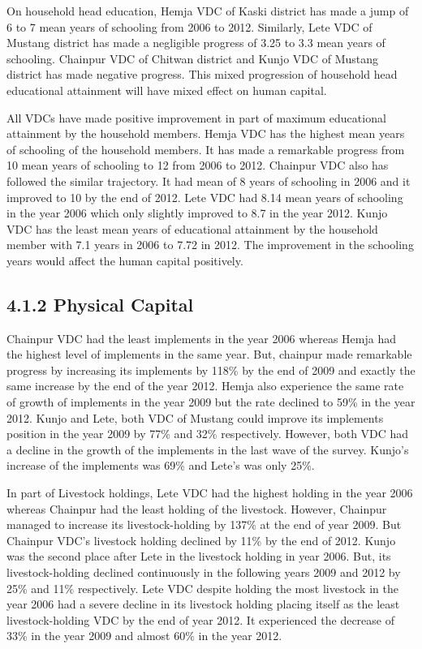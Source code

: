 On household head education, Hemja VDC of Kaski district has made a jump of 6 to 7 mean years of schooling from 2006 to 2012. Similarly, Lete VDC of Mustang district has made a negligible progress of 3.25 to 3.3 mean years of schooling. Chainpur VDC of Chitwan district and Kunjo VDC of Mustang district has made negative progress. This mixed progression of household head educational attainment will have mixed effect on human capital. 

All VDCs have made positive improvement in part of maximum educational attainment by the household members. Hemja VDC has the highest mean years of schooling of the household members. It has made a remarkable progress from 10 mean years of schooling to 12 from 2006 to 2012. Chainpur VDC also has followed the similar trajectory. It had mean of 8 years of schooling in 2006 and it improved to 10 by the end of 2012. Lete VDC had 8.14 mean years of schooling in the year 2006 which only slightly improved to 8.7 in the year 2012. Kunjo VDC has the least mean years of educational attainment by the household member with 7.1 years in 2006 to 7.72 in 2012. The improvement in the schooling years would affect the human capital positively.

\subsection*{4.1.2 Physical Capital}
Chainpur VDC had the least implements in the year 2006 whereas Hemja had the highest level of implements in the same year. But, chainpur made remarkable progress by increasing its implements by 118\%  by the end of 2009 and exactly the same increase by the end of the year 2012. Hemja also experience the same rate of growth of implements in the year 2009 but the rate declined to 59\% in the year 2012. Kunjo and Lete, both VDC of Mustang could improve its implements position in the year 2009 by 77\% and 32\% respectively. However, both VDC had a decline in the growth of the implements in the last wave of the survey. Kunjo's increase of the implements was 69\% and Lete's was only 25\%. 

In part of Livestock holdings, Lete VDC had the highest holding in the year 2006 whereas Chainpur had the least holding of the livestock. However, Chainpur managed to increase its livestock-holding by 137\% at the end of year 2009. But Chainpur VDC's livestock holding declined by 11\% by the end of 2012. Kunjo was the second place after Lete in the livestock holding in year 2006. But, its livestock-holding declined continuously in the following years 2009 and 2012 by 25\% and 11\% respectively. Lete VDC despite holding the most livestock in the year 2006 had a severe decline in its livestock holding placing itself as the least livestock-holding VDC by the end of year 2012. It experienced the decrease of 33\% in the year 2009 and almost 60\% in the year 2012. 

